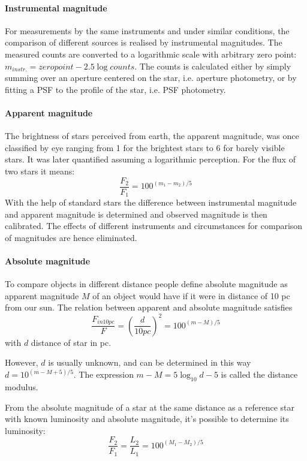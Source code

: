 \paragraph{Instrumental magnitude}
For measurements by the same instruments and under similar conditions, the comparison of different sources is realised by instrumental magnitudes. The measured counts are converted to a logarithmic scale with arbitrary zero point: $m_{instr.} = zero point -2.5 \log {counts}$. The counts is calculated either by simply summing over an aperture centered on the star, i.e. aperture photometry, or by fitting a PSF to the profile of the star, i.e. PSF photometry.
\paragraph{Apparent magnitude}
The brightness of stars perceived from earth, the apparent magnitude, was once classified by eye ranging from 1 for the brightest stars to 6 for barely visible stars. It was later quantified assuming a logarithmic perception. For the flux of two stars it means:
\begin{equation}
\label{Flux}
	\frac{F_2}{F_1}=100^{(m_1-m_2)/5}
\end{equation}
With the help of standard stars the difference between instrumental magnitude and apparent magnitude is determined and observed magnitude is then calibrated. The effects of different instruments and circumstances for comparison of magnitudes are hence eliminated.
\paragraph{Absolute magnitude}
To compare objects in different distance people define absolute magnitude as apparent magnitude $M$ of an object would have if it were in distance of 10 pc from our sun. The relation between apparent and absolute magnitude satisfies 
\begin{equation}
\label{AppAbs}
	\frac{F_{in 10 pc}}{F}=(\frac{d}{10 pc})^2=100^{(m-M)/5}
\end{equation}
with $d$ distance of star in pc. 

However, $d$ is usually unknown, and can be determined in this way $d = 10^{(m-M+5)/5}$. The expression $m-M=5 \log_{10}{d} - 5$ is called the distance modulus. 

From the absolute magnitude of a star at the same distance as a reference star with known luminosity and absolute magnitude, it's possible to determine its luminosity:
\begin{equation}
\label{Lumi}
	\frac{F_2}{F_1}=\frac{L_2}{L_1}=100^{(M_1-M_2)/5}
\end{equation}


